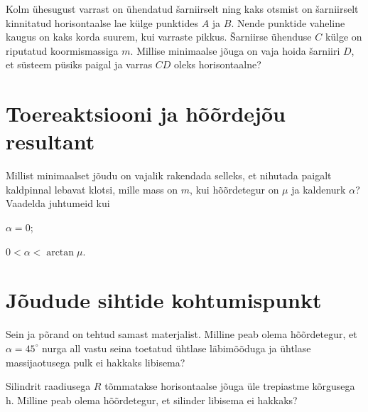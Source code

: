 \documentclass[a4paper,11pt,twocolumn]{article}
\begin{document}
\begin{question}[sta2][3.8cm]
	Kolm ühesugust varrast on ühendatud šarniirselt ning kaks otsmist on šarniirselt kinnitatud horisontaalse lae külge punktides $ A $ ja $ B $. Nende punktide vaheline kaugus on kaks korda suurem, kui varraste pikkus. Šarniirse ühenduse $ C $ külge on riputatud koormismassiga $ m $. Millise minimaalse jõuga on vaja hoida šarniiri $ D $, et süsteem püsiks paigal ja varras $ CD $ oleks horisontaalne?
\end{question}


\section{Toereaktsiooni ja hõõrdejõu resultant}
\begin{question}
	Millist minimaalset jõudu on vajalik rakendada selleks, et nihutada paigalt kaldpinnal lebavat klotsi, mille mass on $ m $, kui hõõrdetegur on $ \mu $ ja kaldenurk $ \alpha $? Vaadelda juhtumeid kui
	\begin{subquestion}
		\item $ \alpha=0 $;
		\item $ 0 <\alpha < \arctan{\mu} $.
	\end{subquestion}
\end{question}

\section{Jõudude sihtide kohtumispunkt}
\begin{question}[Piirk 2004, G8]
Sein ja põrand on tehtud samast materjalist. Milline peab olema hõõrdetegur, et $ \alpha =45^\circ $ nurga all vastu seina toetatud ühtlase läbimõõduga ja ühtlase massijaotusega pulk ei hakkaks libisema?
\end{question}
\begin{question}
	Silindrit raadiusega $ R $ tõmmatakse horisontaalse jõuga üle trepiastme kõrgusega h. Milline peab olema hõõrdetegur, et silinder libisema ei hakkaks?
\end{question}
\end{document}
